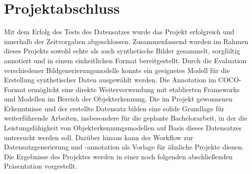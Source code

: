 \section{Projektabschluss}
Mit dem Erfolg des Tests des Datensatzes wurde das Projekt erfolgreich und innerhalb der Zeitvorgaben abgeschlossen. 
Zusammenfassend wurden im Rahmen dieses Projekts sowohl echte als auch synthetische Bilder gesammelt, sorgfältig annotiert und in einem einheitlichen Format bereitgestellt. Durch die Evaluation verschiedener Bildgenerierungsmodelle konnte ein geeignetes Modell für die Erstellung synthetischer Daten ausgewählt werden. Die Annotation im COCO-Format ermöglicht eine direkte Weiterverwendung mit etablierten Frameworks und Modellen im Bereich der Objekterkennung.
Die im Projekt gewonnenen Erkenntnisse und der erstellte Datensatz bilden eine solide Grundlage für weiterführende Arbeiten, insbesondere für die geplante Bachelorarbeit, in der die Leistungsfähigkeit von Objekterkennungsmodellen auf Basis dieses Datensatzes untersucht werden soll. Darüber hinaus kann der Workflow zur Datensatzgenerierung und -annotation als Vorlage für ähnliche Projekte dienen.
Die Ergebnisse des Projektes werden in einer noch folgenden abschließenden Präsentation vorgestellt.

